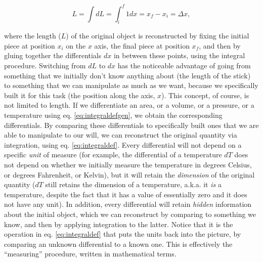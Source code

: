 \documentclass[
  9pt,
]{extbook}
\theoremstyle{definition}
\theoremstyle{definition}
\theoremstyle{definition}
\theoremstyle{definition}
\theoremstyle{remark}
\begin{document}
\begin{equation}
L=\int dL = \int_{i}^{f} 1 dx = x_f-x_i =\Delta x,
\label{eq:integraldef}
\end{equation}

where the length (\(L\)) of the original object is reconstructed by fixing the initial piece at position \(x_i\) on the \(x\) axis, the final piece at position \(x_f\), and then by gluing together the differentials \(dx\) in between these points, using the integral procedure. Switching from \(dL\) to \(dx\) has the noticeable advantage of going from something that we initially don't know anything about (the length of the stick) to something that we can manipulate as much as we want, because we specifically built it for this task (the position along the axis, \(x\)). This concept, of course, is not limited to length. If we differentiate an area, or a volume, or a pressure, or a temperature using eq. \eqref{eq:integraldefgen}, we obtain the corresponding differentials. By comparing these differentials to specifically built ones that we are able to manipulate to our will, we can reconstruct the original quantity via integration, using eq. \eqref{eq:integraldef}. Every differential will not depend on a specific \emph{unit} of measure (for example, the differential of a temperature \(dT\) does not depend on whether we initially measure the temperature in degrees Celsius, or degrees Fahrenheit, or Kelvin), but it will retain the \emph{dimension} of the original quantity (\(dT\) still retains the dimension of a temperature, a.k.a. it \emph{is} a temperature, despite the fact that it has a value of essentially zero and it does not have any unit). In addition, every differential will retain \emph{hidden} information about the initial object, which we can reconstruct by comparing to something we know, and then by applying integration to the latter. Notice that it is the operation in eq. \eqref{eq:integraldef} that puts the units back into the picture, by comparing an unknown differential to a known one. This is effectively the ``measuring'' procedure, written in mathematical terms.
\end{document}

